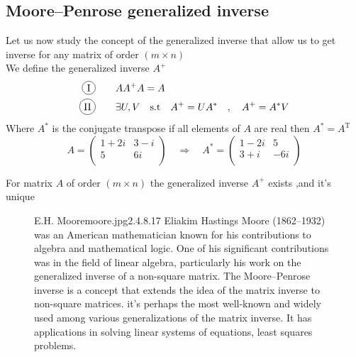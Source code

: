 \subsection{Moore–Penrose generalized inverse}
Let us now study the concept of the generalized inverse that allow us to get inverse for any matrix of order $(m\times n)$
\\
We define the generalized inverse $A^{+}$
\begin{align*}
    \circled{I}  & \dquad AA^{+}A = A
    \\
    \circled{II} & \dquad \exists  U,V \quad \text{s.t} \quad A^{+} = UA^{*} \quad,\quad A^{+} = A^{*}V
\end{align*}
Where $A^{*}$ is the conjugate transpose if all elements of $A$ are real then $A^{*} = A^{\operatorname{T}}$
\[
    A = \begin{pmatrix}
        1+2i & 3-i \\
        5    & 6i  \\
    \end{pmatrix}
    \quad\Longrightarrow \quad
    A^{*} = \begin{pmatrix}
        1-2i & 5   \\
        3+i  & -6i \\
    \end{pmatrix}
\]
\begin{theorem}
    For matrix $A$ of order $(m\times n)$ the generalized inverse $A^{+}$ exists ,and it's unique
\end{theorem}
\begin{figure}[b]
    \begin{enrichment}{E.H. Moore}{moore.jpg}{2.4}{.8}{.17}
        Eliakim Hastings Moore (1862–1932) was an American mathematician known for his contributions to algebra and mathematical logic.
        One of his significant contributions was in the field of linear algebra,
        particularly his work on the generalized inverse of a non-square matrix.
        The Moore–Penrose inverse is a concept that extends the idea of the matrix inverse to non-square matrices.
        it's perhaps the most well-known and widely used among various generalizations of the matrix inverse.
        It has applications in solving linear systems of equations, least squares problems.
    \end{enrichment}
\end{figure}
